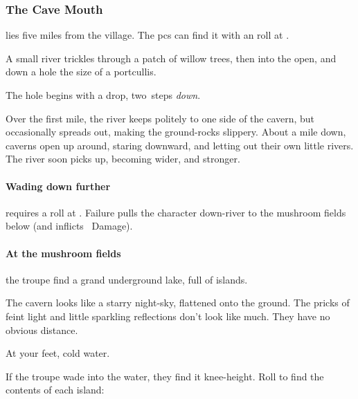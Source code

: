 \documentclass[10pt,twoside]{book}
\begin{document}
\subsubsection{The Cave Mouth}\label{caveMouth}
lies five miles from the \gls{village}.
The \glspl{pc} can find it with an  roll at \tn[12].

\togglefalse{intro}

\begin{boxtext}
  A small river trickles through a patch of willow trees, then into the open, and down a hole the size of a portcullis.
\end{boxtext}

The hole begins with a drop, two~\glspl{step} \emph{down}.%

\begin{boxtext}
  Over the first mile, the river keeps politely to one side of the cavern, but occasionally spreads out, making the ground-rocks slippery.
  About a mile down, caverns open up around, staring downward, and letting out their own little rivers.
  The river soon picks up, becoming wider, and stronger.
\end{boxtext}

\paragraph{Wading down further}
requires a  roll at \tn[8].
Failure pulls the character down-river to the mushroom fields below (and inflicts ~Damage).

\paragraph{At the mushroom fields}
the troupe find a grand underground lake, full of islands.


\begin{boxtext}
  The cavern looks like a starry night-sky, flattened onto the ground.
  The pricks of feint light and little sparkling reflections don't look like much.
  They have no obvious distance.

  At your feet, cold water.
\end{boxtext}

If the troupe wade into the water, they find it knee-height.
Roll to find the contents of each island:
\end{document}
